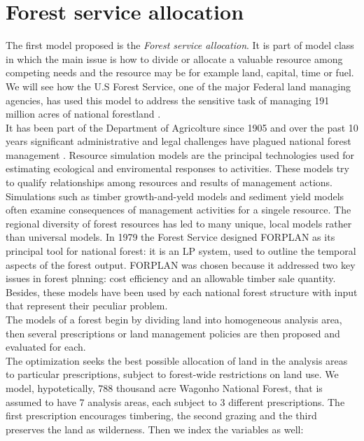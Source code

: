 \documentclass[a4paper,10 pt,titlepage,twoside]{book}
\theoremstyle{plain}
\theoremstyle{definition}
\theoremstyle{remark}
\begin{document}
{{\section{Forest service allocation} 
The first model proposed is the \textit{Forest service allocation}. It is part of model class in which the main issue is how to divide or allocate a valuable resource among competing needs and the resource may be for example land, capital, time or fuel. We will see how the U.S Forest Service, one of the major Federal land managing agencies, has used this model to address the sensitive task of managing 191 million acres of national forestland \cite{(Natural)}.\\
It has been part of the Department of Agricolture since 1905 and over the past 10 years significant administrative and legal challenges have plagued national forest management \cite{ForSer}. Resource simulation models are the principal technologies used for estimating ecological and enviromental responses to activities. These models try to qualify relationships among resources and results of management actions. Simulations such as timber growth-and-yeld models and sediment yield models often examine consequences of management activities for a singele resource. The regional diversity of forest resources has led to many unique, local models rather than universal models. In 1979 the Forest Service designed FORPLAN as its principal tool for national forest: it is an LP system, used to outline the temporal aspects of the forest output. FORPLAN was chosen because it addressed two key issues in forest plnning: cost efficiency and an allowable timber sale quantity. Besides, these models have been used by each national forest structure with input that represent their peculiar problem.\\
The models of a forest begin by dividing land into homogeneous analysis area, then several prescriptions or land management policies are then proposed and evaluated for each. \\The optimization seeks the best possible allocation of land in the analysis areas to particular prescriptions, subject to forest-wide restrictions on land use.
We model, hypotetically, 788 thousand acre Wagonho National Forest, that is assumed to have 7 analysis areas, each subject to 3 different prescriptions. The first prescription encourages timbering, the second grazing and the third preserves the land as wilderness. Then we index the variables as well:
\begin{itemize}

\end{itemize}}}
\end{document}
